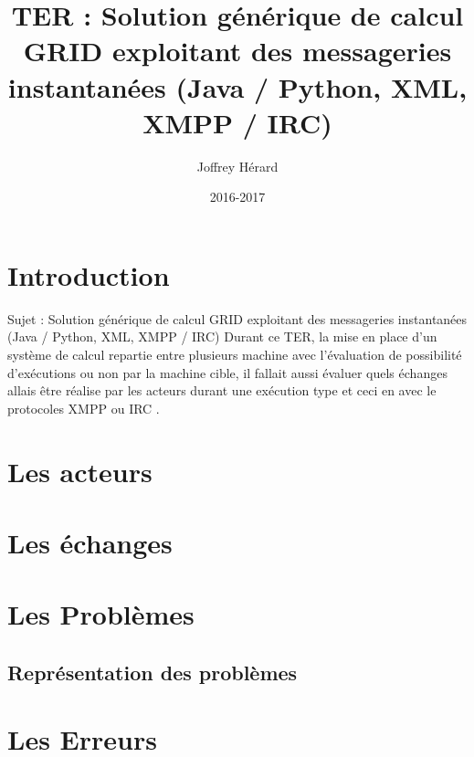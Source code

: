 \documentclass[11pt]{report}
\begin{document}
 \makeatletter
\def\maketitle{%
  \null
  \thispagestyle{empty}%
  \vfill
  \begin{center}\leavevmode
    \normalfont
    {\Huge \@title\par}%
    \vskip 3cm
    {\Large \@author\par}%
    \vskip 1cm
    {\Large \@date\par}%
  \end{center}%
  \vfill
  \null
  \cleardoublepage
  }
\makeatother
\title{TER : Solution générique de calcul GRID exploitant des messageries instantanées
(Java / Python, XML, XMPP / IRC)}
\author{Joffrey Hérard}
\date{2016-2017}
\maketitle
 
\tableofcontents 

\newpage
\chapter{Introduction} 
Sujet : Solution générique de calcul GRID exploitant des messageries instantanées
(Java / Python, XML, XMPP / IRC)
Durant ce TER, la mise en place d'un système de calcul repartie entre plusieurs machine avec l’évaluation de possibilité d’exécutions ou non par la machine cible, il fallait aussi évaluer quels échanges allais être réalise par les acteurs durant une exécution type et ceci en avec le protocoles XMPP ou IRC . 
\newpage
\chapter{Les acteurs} 
\newpage
\chapter{Les échanges} 
\newpage
\chapter{Les Problèmes} 
\section{Représentation des problèmes} 
\newpage
\chapter{Les Erreurs} 
\end{document}
